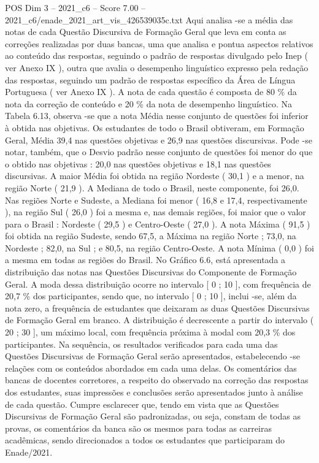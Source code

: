 \begin{textsample}{POS Dim 3 – 2021\_c6 – Score 7.00 – 2021\_c6/enade\_2021\_art\_vis\_426539035c.txt}
Aqui analisa -se a média das notas de cada Questão Discursiva de Formação Geral que leva em conta as correções realizadas por duas bancas, uma que analisa e pontua aspectos relativos ao conteúdo das respostas, seguindo o padrão de respostas divulgado pelo Inep ( ver Anexo IX ), outra que avalia o desempenho linguístico expresso pela redação das respostas, seguindo um padrão de respostas específico da Área de Língua Portuguesa ( ver Anexo IX ).
A nota de cada questão é composta de 80 \% da nota da correção de conteúdo e 20 \% da nota de desempenho linguístico.
Na Tabela 6.13, observa -se que a nota Média nesse conjunto de questões foi inferior à obtida nas objetivas.
Os estudantes de todo o Brasil obtiveram, em Formação Geral, Média 39,4 nas questões objetivas e 26,9 nas questões discursivas.
Pode -se notar, também, que o Desvio padrão nesse conjunto de questões foi menor do que o obtido nas objetivas : 20,0 nas questões objetivas e 18,1 nas questões discursivas.
A maior Média foi obtida na região Nordeste ( 30,1 ) e a menor, na região Norte ( 21,9 ).
A Mediana de todo o Brasil, neste componente, foi 26,0.
Nas regiões Norte e Sudeste, a Mediana foi menor ( 16,8 e 17,4, respectivamente ), na região Sul ( 26,0 ) foi a mesma e, nas demais regiões, foi maior que o valor para o Brasil : Nordeste ( 29,5 ) e Centro-Oeste ( 27,0 ).
A nota Máxima ( 91,5 ) foi obtida na região Sudeste, sendo 67,5, a Máxima na região Norte ; 73,0, na Nordeste ; 82,0, na Sul ; e 80,5, na região Centro-Oeste.
A nota Mínima ( 0,0 ) foi a mesma em todas as regiões do Brasil.
No Gráfico 6.6, está apresentada a distribuição das notas nas Questões Discursivas do Componente de Formação Geral.
A moda dessa distribuição ocorre no intervalo [ 0 ; 10 ], com frequência de 20,7 \% dos participantes, sendo que, no intervalo [ 0 ; 10 ], inclui -se, além da nota zero, a frequência de estudantes que deixaram as duas Questões Discursivas de Formação Geral em branco.
A distribuição é decrescente a partir do intervalo ( 20 ; 30 ], um máximo local, com frequência próxima à modal com 20,3 \% dos participantes.
Na sequência, os resultados verificados para cada uma das Questões Discursivas de Formação Geral serão apresentados, estabelecendo -se relações com os conteúdos abordados em cada uma delas.
Os comentários das bancas de docentes corretores, a respeito do observado na correção das respostas dos estudantes, suas impressões e conclusões serão apresentados junto à análise de cada questão.
Cumpre esclarecer que, tendo em vista que as Questões Discursivas de Formação Geral são padronizadas, ou seja, constam de todas as provas, os comentários da banca são os mesmos para todas as carreiras acadêmicas, sendo direcionados a todos os estudantes que participaram do Enade/2021.

\end{textsample}
